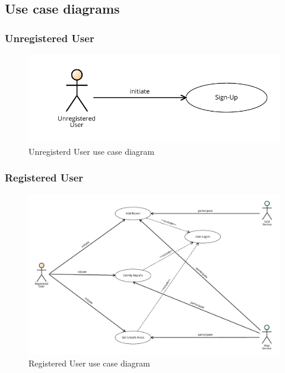 			\subsection{Use case diagrams}
				\subsubsection{Unregistered User}
					\begin{figure}[!h]
						\centering
						\includegraphics[width=\textwidth]{images/UseCase/UU.pdf}
						\caption{Unregisterd User use case diagram}
					\end{figure}
				\subsubsection{Registered User}
					\begin{figure}[!h]
						\centering
						\includegraphics[width=\textwidth]{images/UseCase/RU.pdf}
						\caption{Registered User use case diagram}
					\end{figure}
				\clearpage
